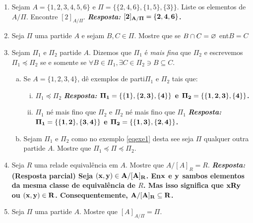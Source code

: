 \begin{enumerate}[{\bf 1.}]

\item Sejam $A=\{1,2,3,4,5,6\}$ e $\Pi=\{\{2,4,6\},\{1,5\},\{3\}\}$. Liste os elementos de $A/\Pi$. Encontre $[2]_{A/\Pi}$. 
{\bf{\it Resposta:} ${\bf [2]_{A/\Pi}=\{2,4,6\}}$.}

\item Seja $\Pi$ uma parti\cao de $A$ e sejam $B,C\in\Pi$. Mostre que se $B\cap C=\varnothing$ ent\ao $B=C$

\item\label{eqrexcerc3} Sejam $\Pi_1$ e $\Pi_2$ parti\coes de $A$. Dizemos que $\Pi_1$ \'e {\it mais fina} que $\Pi_2$ e escrevemos $\Pi_1\preceq\Pi_2$ se e somente se $\forall B\in \Pi_1, \exists C\in \Pi_2 \ni B\subseteq C$.
\begin{enumerate}[a)]
\item Se $A=\{1,2,3,4\}$, d\^e exemplos de parti\coes $\Pi_1$ e $\Pi_2$ tais que:
\begin{enumerate}[i.]
\item $\Pi_1\preceq\Pi_2$ {\bf{\it Resposta:} ${\bf \Pi_1=\{\{1\},\{2,3\},\{4\}\}}$ e ${\bf \Pi_2=\{\{1,2,3\},\{4\}\}}$.}
\item $\Pi_1$ n\ao \'e mais fino que $\Pi_2$ e $\Pi_2$ n\ao \'e mais fino que $\Pi_1$ {\bf{\it Resposta:} ${\bf \Pi_1=\{\{1,2\},\{3,4\}\}}$ e ${\bf \Pi_2=\{\{1,3\},\{2,4\}\}}$.}
\end{enumerate}
\item Sejam $\Pi_1$ e $\Pi_2$ como no exemplo \ref{eqexe1} desta se\cao e seja $\Pi$ qualquer outra parti\cao de $A$. Mostre que $\Pi_1\preceq\Pi\preceq\Pi_2$.
\end{enumerate}

\item Seja $R$ uma rela\cao de equival\^encia em $A$. Mostre que $A/[A]_R=R$. {\bf{\it Resposta:} (Resposta parcial) Seja ${\bf (x,y)\in A/[A]_R }$. En\tao ${\bf x}$ e ${\bf y}$ s\ao ambos elementos da mesma classe de equival\^encia de $R$. Mas isso significa que ${\bf xRy}$ ou ${\bf (x,y)\in R}$. Consequentemente, ${\bf A/[A]_R\subseteq R}$.}

\item Seja $\Pi$ uma parti\cao de $A$. Mostre que $[A]_{A/\Pi}=\Pi$.


\end{enumerate}
